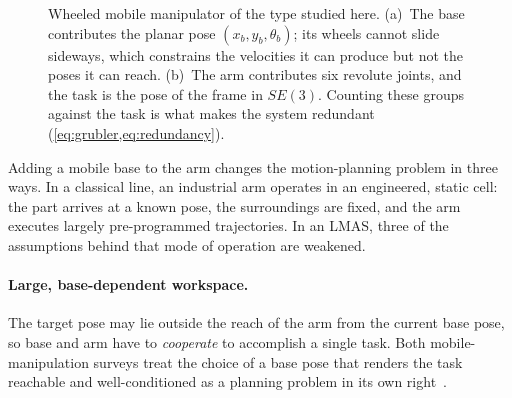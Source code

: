\begin{figure}[htbp]
  \caption[Mobile manipulator: base and arm degrees of freedom]{%
    Wheeled mobile manipulator of the type studied here. (a)~The base
    contributes the planar pose $(x_b,y_b,\theta_b)$; its wheels cannot
    slide sideways, which constrains the velocities it can produce but
    not the poses it can reach. (b)~The arm contributes six revolute
    joints, and the task is the pose of the \ee{} frame in $SE(3)$.
    Counting these groups against the task is what makes the system
    redundant (\cref{eq:grubler,eq:redundancy}).}
  \label{fig:mobile-manipulator}
\end{figure}

Adding a mobile base to the arm changes the motion-planning problem in
three ways. In a classical line, an industrial arm operates in an
engineered, static cell: the part arrives at a known pose, the
surroundings are fixed, and the arm executes largely pre-programmed
trajectories. In an LMAS, three of the assumptions behind that mode of
operation are weakened.

\paragraph{Large, base-dependent workspace.}
The target \ee{} pose may lie outside the reach of the arm from the
current base pose, so base and arm have to \emph{cooperate} to
accomplish a single task. Both mobile-manipulation surveys treat the
choice of a base pose that renders the task reachable and
well-conditioned as a planning problem in its own
right~\cite{Sandakalum2022Survey,Thakar2023MobileManip}.

